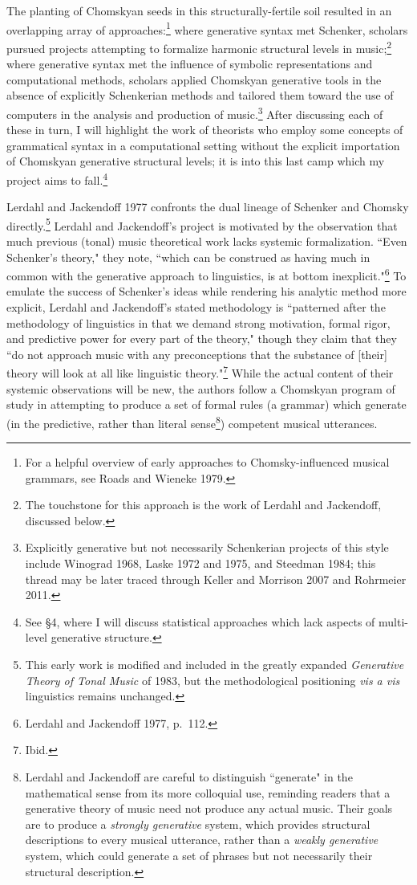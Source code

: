 The planting of Chomskyan seeds in this structurally-fertile soil resulted in an overlapping array of approaches:\footnote{For a helpful overview of early approaches to Chomsky-influenced musical grammars, see Roads and Wieneke 1979.}  where generative syntax met Schenker, scholars pursued projects attempting to formalize harmonic structural levels in music;\footnote{The touchstone for this approach is the work of Lerdahl and Jackendoff, discussed below.} where generative syntax met the influence of symbolic representations and computational methods, scholars applied Chomskyan generative tools in the absence of explicitly Schenkerian methods and tailored them toward the use of computers in the analysis and production of music.\footnote{Explicitly generative but not necessarily Schenkerian projects of this style include Winograd 1968, Laske 1972 and 1975, and Steedman 1984; this thread may be later traced through Keller and Morrison 2007 and Rohrmeier 2011.}  After discussing each of these in turn, I will highlight the work of theorists who employ some concepts of grammatical syntax in a computational setting without the explicit importation of Chomskyan generative structural levels; it is into this last camp which my project aims to fall.\footnote{See \S 4, where I will discuss statistical approaches which lack aspects of multi-level generative structure.}

Lerdahl and Jackendoff 1977 confronts the dual lineage of Schenker and Chomsky directly.\footnote{This early work is modified and included in the greatly expanded \emph{Generative Theory of Tonal Music} of 1983, but the methodological positioning \emph{vis a vis} linguistics remains unchanged.}  Lerdahl and Jackendoff's project is motivated by the observation that much previous (tonal) music theoretical work lacks systemic formalization.  ``Even Schenker's theory," they note, ``which can be construed as having much in common with the generative approach to linguistics, is at bottom inexplicit."\footnote{Lerdahl and Jackendoff 1977, p.\ 112.}  To emulate the success of Schenker's ideas while rendering his analytic method more explicit, Lerdahl and Jackendoff's stated methodology is ``patterned after the methodology of linguistics in that we demand strong motivation, formal rigor, and predictive power for every part of the theory," though they claim that they ``do not approach music with any preconceptions that the substance of [their] theory will look at all like linguistic theory."\footnote{Ibid.}  While the actual content of their systemic observations will be new, the authors follow a Chomskyan program of study in attempting to produce a set of formal rules (a grammar) which generate (in the predictive, rather than literal sense\footnote{Lerdahl and Jackendoff are careful to distinguish ``generate" in the mathematical sense from its more colloquial use, reminding readers that a generative theory of music need not produce any actual music.  Their goals are to produce a \emph{strongly generative} system, which provides structural descriptions to every musical utterance, rather than a \emph{weakly generative} system, which could generate a set of phrases but not necessarily their structural description.}) competent musical utterances.

